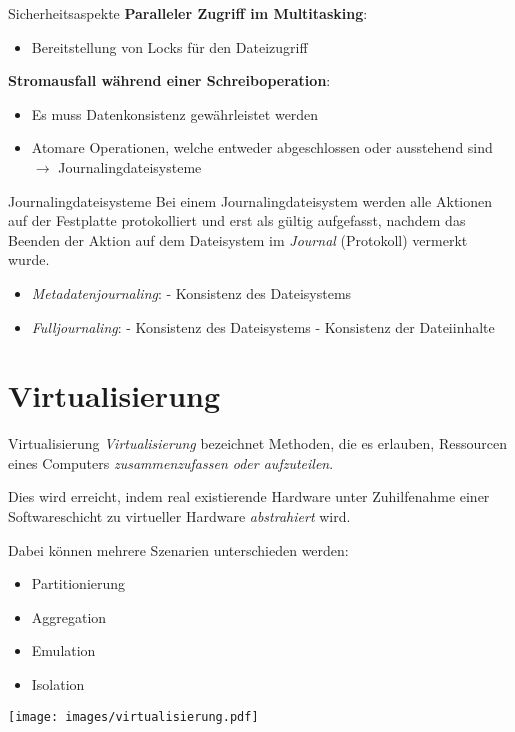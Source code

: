 \documentclass[german]{../spicker}
\begin{document}
\begin{bonus}{Sicherheitsaspekte}
    \textbf{Paralleler Zugriff im Multitasking}:
    \begin{itemize}
        \item Bereitstellung von Locks für den Dateizugriff
    \end{itemize}

    \textbf{Stromausfall während einer Schreiboperation}:
    \begin{itemize}
        \item Es muss Datenkonsistenz gewährleistet werden
        \item Atomare Operationen, welche entweder abgeschlossen oder ausstehend sind
              \subitem $\to$ Journalingdateisysteme
    \end{itemize}
\end{bonus}

\begin{defi}{Journalingdateisysteme}
    Bei einem Journalingdateisystem werden alle Aktionen auf der Festplatte protokolliert
    und erst als gültig aufgefasst, nachdem das Beenden der Aktion auf dem Dateisystem
    im \emph{Journal} (Protokoll) vermerkt wurde.

    \begin{itemize}
        \item \emph{Metadatenjournaling}:
              \subitem - Konsistenz des Dateisystems
        \item \emph{Fulljournaling}:
              \subitem - Konsistenz des Dateisystems
              \subitem - Konsistenz der Dateiinhalte
    \end{itemize}

\end{defi}

\section{Virtualisierung}

\begin{defi}{Virtualisierung}
    \emph{Virtualisierung} bezeichnet Methoden, die es erlauben, Ressourcen
    eines Computers \emph{zusammenzufassen oder aufzuteilen}.

    Dies wird erreicht, indem real existierende Hardware unter
    Zuhilfenahme einer Softwareschicht zu virtueller Hardware \emph{abstrahiert} wird.

    Dabei können mehrere Szenarien unterschieden werden:
    \begin{itemize}
        \item Partitionierung
        \item Aggregation
        \item Emulation
        \item Isolation
    \end{itemize}
    \vspace{1em}
    \begin{center}
        \texttt{[image: images/virtualisierung.pdf]}
    \end{center}
\end{defi}
\end{document}
